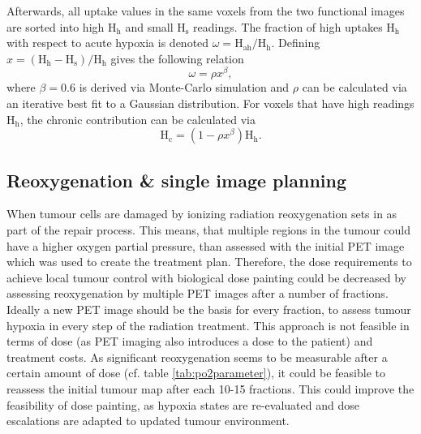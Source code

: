 Afterwards, all uptake values in the same voxels from the two functional images are sorted into high H$_\mathrm{h}$ and small H$_\mathrm{s}$ readings. The fraction of high uptakes H$_\mathrm{h}$ with respect to acute hypoxia is denoted $\omega = \mathrm{H}_\mathrm{ah}/\mathrm{H}_\mathrm{h}$. Defining $x = (\mathrm{H}_\mathrm{h} - \mathrm{H}_\mathrm{s})/\mathrm{H}_\mathrm{h}$ gives the following relation
\begin{equation}
\omega = \rho x^\beta,
\end{equation}
where $\beta=0.6$ is derived via Monte-Carlo simulation and $\rho$ can be calculated via an iterative best fit to a Gaussian distribution. For voxels that have high readings H$_\mathrm{h}$, the chronic contribution can be calculated via
\begin{equation}
\mathrm{H}_\mathrm{c} = (1-\rho x^\beta)\mathrm{H}_\mathrm{h}.
\end{equation}
\subsection{Reoxygenation \& single image planning}\label{chap:reoxygenation}
When tumour cells are damaged by ionizing radiation reoxygenation sets in as part of the repair process. This means, that multiple regions in the tumour could have a higher oxygen partial pressure, than assessed with the initial PET image which was used to create the treatment plan. Therefore, the dose requirements to achieve local tumour control with biological dose painting could be decreased by assessing reoxygenation by multiple PET images after a number of fractions. Ideally a new PET image should be the basis for every fraction, to assess tumour hypoxia in every step of the radiation treatment. This approach is not feasible in terms of dose (as PET imaging also introduces a dose to the patient) and treatment costs. As significant reoxygenation seems to be measurable after a certain amount of dose (cf. table \ref{tab:po2parameter}), it could be feasible to reassess the initial tumour map after each 10-15 fractions. This could improve the feasibility of dose painting, as hypoxia states are re-evaluated and dose escalations are adapted to updated tumour environment. 
